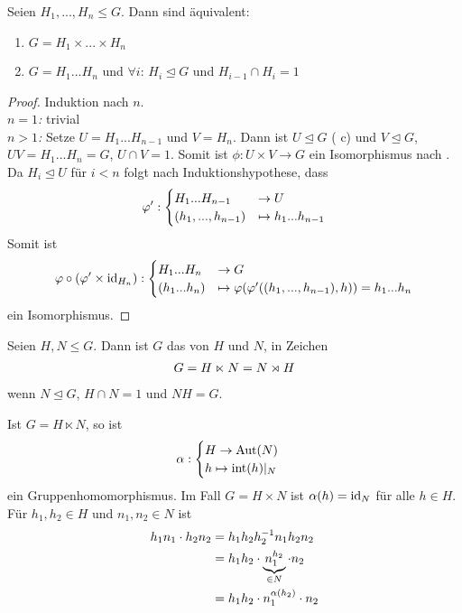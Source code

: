 \begin{conclusion}
	Seien $H_1,...,H_n\le G$. Dann sind äquivalent:
	\begin{enumerate}[label=(\roman*)]
		\item $G=H_1\times ...\times H_n$
		\item $G=H_1...H_n$ und $\forall i$: $H_i\unlhd G$ und $H_{i-1}\cap H_i=1$
	\end{enumerate}
\end{conclusion}
\begin{proof}
	Induktion nach $n$. \\
	\emph{$n=1$:} trivial \\
	\emph{$n>1$:} Setze $U=H_1...H_{n-1}$ und $V=H_n$. Dann ist $U\unlhd G$ ( c) und $V\unlhd G$, $UV=H_1...H_n=G$, $U\cap V=1$. Somit ist $\phi: U\times V\to G$ ein Isomorphismus nach . Da $H_i\unlhd U$ für $i<n$ folgt nach Induktionshypothese, dass
	\begin{align}
		\phi':\begin{cases}
		H_1...H_{n-1} &\to U \\ (h_1,...,h_{n-1}) &\mapsto h_1...h_{n-1}
		\end{cases}\notag
	\end{align}
	Somit ist 
	\begin{align}
		\phi\circ (\phi'\times \id_{H_n}):\begin{cases}
		H_1...H_n &\to G \\ (h_1...h_n) &\mapsto \phi(\phi'((h_1,...,h_{n-1}),h))=h_1...h_n
		\end{cases}\notag
	\end{align}
	ein Isomorphismus.
\end{proof}

\begin{definition}
	Seien $H,N\le G$. Dann ist $G$ das  von $H$ und $N$, in Zeichen
	\begin{align}
		G=H\ltimes N = N\rtimes H\notag
	\end{align}
	wenn $N\unlhd G$, $H\cap N=1$ und $NH=G$.
\end{definition}

\begin{remark}
	Ist $G=H \ltimes N$, so ist
	\begin{align}
		\alpha: \begin{cases}
		H\to \Aut(N) \\ h \mapsto \Int(h)\vert_N
		\end{cases}\notag
	\end{align}
	ein Gruppenhomomorphismus. Im Fall $G=H\times N$ ist $\alpha(h)=\id_N$ für alle $h\in H$. Für $h_1,h_2\in H$ und $n_1,n_2\in N$ ist
	\begin{align}
		h_1n_1\cdot h_2n_2 &= h_1h_2h_2^{-1}n_1h_2n_2 \notag \\
		&= h_1h_2\cdot \underbrace{n_1^{h_2}}_{\in N}\cdot n_2 \notag \\
		\label{1.2}
		&= h_1h_2\cdot n_1^{\alpha(h_2)}\cdot n_2
	\end{align}
\end{remark}

